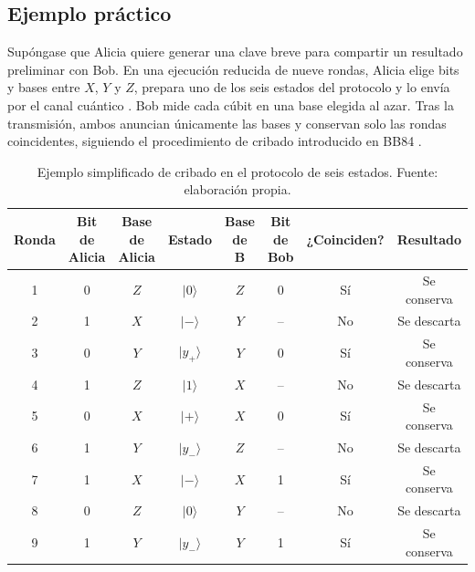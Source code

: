 \subsection{Ejemplo práctico}

Supóngase que Alicia quiere generar una clave breve para compartir un resultado preliminar con Bob. En una ejecución reducida de nueve rondas, Alicia elige bits y bases entre $X$, $Y$ y $Z$, prepara uno de los seis estados del protocolo y lo envía por el canal cuántico \citep{bruss1998}. Bob mide cada cúbit en una base elegida al azar. Tras la transmisión, ambos anuncian únicamente las bases y conservan solo las rondas coincidentes, siguiendo el procedimiento de cribado introducido en BB84 \citep{bennett1984}.

\begin{table}[h]
    \centering
    \scriptsize
    \begin{tabular}{c c c c c c c c}
        \hline\hline
        Ronda & Bit de Alicia & Base de Alicia & Estado & Base de B & Bit de Bob & ¿Coinciden? & Resultado \\
        \hline
        1 & 0 & $Z$ & $|0\rangle$ & $Z$ & 0 & Sí & Se conserva \\
        2 & 1 & $X$ & $|-\rangle$ & $Y$ & -- & No & Se descarta \\
        3 & 0 & $Y$ & $|y_+\rangle$ & $Y$ & 0 & Sí & Se conserva \\
        4 & 1 & $Z$ & $|1\rangle$ & $X$ & -- & No & Se descarta \\
        5 & 0 & $X$ & $|+\rangle$ & $X$ & 0 & Sí & Se conserva \\
        6 & 1 & $Y$ & $|y_-\rangle$ & $Z$ & -- & No & Se descarta \\
        7 & 1 & $X$ & $|-\rangle$ & $X$ & 1 & Sí & Se conserva \\
        8 & 0 & $Z$ & $|0\rangle$ & $Y$ & -- & No & Se descarta \\
        9 & 1 & $Y$ & $|y_-\rangle$ & $Y$ & 1 & Sí & Se conserva \\
        \hline
    \end{tabular}
    \caption[Ejemplo de cribado en el protocolo de seis estados]{Ejemplo simplificado de cribado en el protocolo de seis estados. Fuente: elaboración propia.}
    \label{tab:seis_estados_ejemplo}
\end{table}

